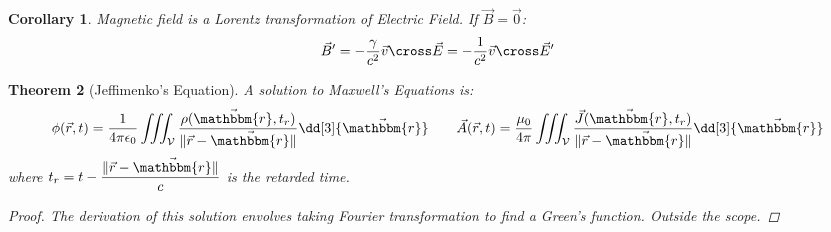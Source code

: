 \documentclass[12pt]{article}
\newcommand*{\rv}{\vec{r}}
\newcommand*{\irv}{\vec{\mathbbm{r}}}
\newcommand*{\vE}{\vec{E}}
\newcommand*{\vB}{\vec{B}}
\newcommand*{\vJ}{\vec{J}}
\newcommand*{\vA}{\vec{A}}
\newcommand*{\ee}{\epsilon_0}
\newcommand*{\mmu}{\mu_0}
\newcommand*{\vol}{\mathcal{V}}
\newtheorem{theorem}{Theorem}[subsection]
\newtheorem{corollary}[theorem]{Corollary}
\begin{document}
\begin{corollary}
  Magnetic field is a Lorentz transformation of Electric Field. If $\vB=\vec{0}$: $$\vB'=-\frac{\gamma}{c^2} \vec{v}\cross\vE=-\frac{1}{c^2} \vec{v}\cross\vE'$$
\end{corollary}

\begin{theorem}[Jeffimenko's Equation]
  A solution to Maxwell's Equations is:
  $$\phi(\rv,t)=\frac{1}{4\pi\ee}\iiint_\vol\frac{\rho(\irv,t_r)}{\|\rv-\irv\|}\dd[3]{\irv}\qquad\vA(\rv,t)=\frac{\mmu}{4\pi}\iiint_\vol\frac{\vJ(\irv,t_r)}{\|\rv-\irv\|}\dd[3]{\irv}$$ where $t_r=t-\dfrac{\|\rv-\irv\|}{c}$ is the retarded time.
  \begin{proof}
    The derivation of this solution envolves taking Fourier transformation to find a Green's function. Outside the scope.
  \end{proof}
\end{theorem}
\end{document}
